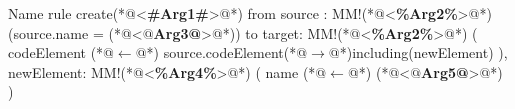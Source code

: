 






\begin{codigo}[caption={[\textit{Template} ATL para realizar a operação atômica \texttt{add}.] \textit{Template} ATL para realizar a operação atômica \texttt{add}.},escapeinside={(*@}{@*)}, basicstyle=\footnotesize, label={codigo:template_addKDMElement}, language=ATL]{Name}
rule create(*@<\textbf{\#Arg1\#}>@*){
	from
		source : MM!(*@<\textbf{\%Arg2\%}>@*) (source.name = (*@<\textbf{$@$Arg3@}>@*))
	to 
		target: MM!(*@<\textbf{\%Arg2\%}>@*) (
			codeElement (*@$\leftarrow$@*) source.codeElement(*@$\rightarrow$@*)including(newElement)
		),
		newElement: MM!(*@<\textbf{\%Arg4\%}>@*) (
			name (*@$\leftarrow$@*) (*@<\textbf{$@$Arg5@}>@*)
		)
}
\end{codigo}




